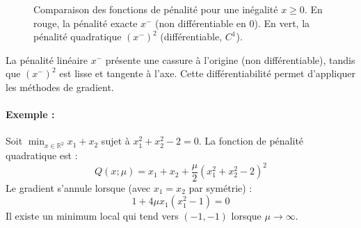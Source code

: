 \begin{figure}[H]
\centering
{}
\caption{Comparaison des fonctions de pénalité pour une inégalité $x \ge 0$. En rouge, la pénalité exacte $x^-$ (non différentiable en 0). En vert, la pénalité quadratique $(x^-)^2$ (différentiable, $C^1$).}
\label{fig:penalty-functions-comparison}
\end{figure}

\begin{figureexplanation}
La pénalité linéaire $x^-$ présente une cassure à l'origine (non différentiable), tandis que $(x^-)^2$ est lisse et tangente à l'axe. Cette différentiabilité permet d'appliquer les méthodes de gradient.
\end{figureexplanation}

\paragraph{Exemple :}
Soit $\min_{x \in \mathbb{R}^2} x_1 + x_2$ sujet à $x_1^2 + x_2^2 - 2 = 0$.
La fonction de pénalité quadratique est :
\begin{equation}
    Q(x; \mu) = x_1 + x_2 + \frac{\mu}{2} (x_1^2 + x_2^2 - 2)^2
\end{equation}
Le gradient s'annule lorsque (avec $x_1 = x_2$ par symétrie) :
\begin{equation}
    1 + 4\mu x_1 (x_1^2 - 1) = 0
\end{equation}
Il existe un minimum local qui tend vers $(-1, -1)$ lorsque $\mu \to \infty$.

